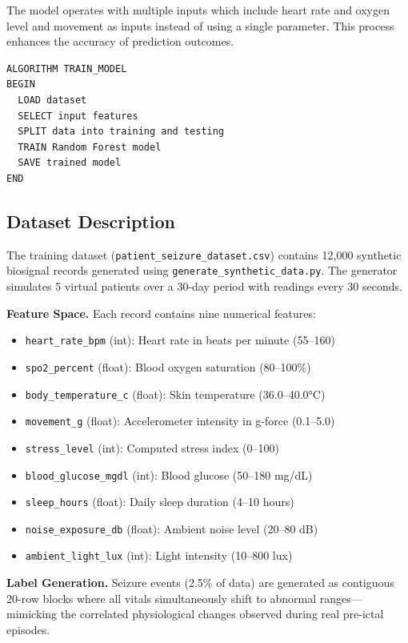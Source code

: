 \documentclass[12pt, a4paper, oneside]{report}
\begin{document}
The model operates with multiple inputs which include heart rate and oxygen level and movement as inputs instead of using a single parameter. This process enhances the accuracy of prediction outcomes.

\begin{lstlisting}
ALGORITHM TRAIN_MODEL
BEGIN
  LOAD dataset
  SELECT input features
  SPLIT data into training and testing
  TRAIN Random Forest model
  SAVE trained model
END
\end{lstlisting}

\subsection{Dataset Description}
The training dataset (\texttt{patient\_seizure\_dataset.csv}) contains 12,000 synthetic biosignal records generated using \texttt{generate\_synthetic\_data.py}. The generator simulates 5 virtual patients over a 30-day period with readings every 30 seconds.

\textbf{Feature Space.} Each record contains nine numerical features:
\begin{itemize}
    \item \texttt{heart\_rate\_bpm} (int): Heart rate in beats per minute (55--160)
    \item \texttt{spo2\_percent} (float): Blood oxygen saturation (80--100\%)
    \item \texttt{body\_temperature\_c} (float): Skin temperature (36.0--40.0°C)
    \item \texttt{movement\_g} (float): Accelerometer intensity in g-force (0.1--5.0)
    \item \texttt{stress\_level} (int): Computed stress index (0--100)
    \item \texttt{blood\_glucose\_mgdl} (int): Blood glucose (50--180 mg/dL)
    \item \texttt{sleep\_hours} (float): Daily sleep duration (4--10 hours)
    \item \texttt{noise\_exposure\_db} (float): Ambient noise level (20--80 dB)
    \item \texttt{ambient\_light\_lux} (int): Light intensity (10--800 lux)
\end{itemize}

\textbf{Label Generation.} Seizure events (2.5\% of data) are generated as contiguous 20-row blocks where all vitals simultaneously shift to abnormal ranges---mimicking the correlated physiological changes observed during real pre-ictal episodes.
\end{document}
